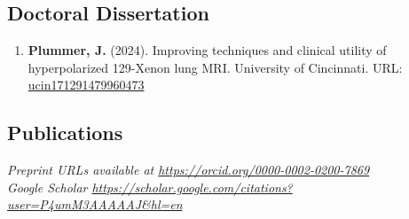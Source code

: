 \documentclass[12pt,]{scrartcl}
\begin{document}
\subsection{Doctoral Dissertation}\label{dissertation}
\begin{enumerate}
    \leftskip-0.13in
    \item \textbf{Plummer, J.} (2024). Improving techniques and clinical utility of hyperpolarized 129-Xenon lung MRI. University of Cincinnati. URL: \href{http://rave.ohiolink.edu/etdc/view?acc_num=ucin171291479960473}{ucin171291479960473}
    
\end{enumerate}
\subsection{Publications}\label{publications}

\emph{Preprint URLs available at
\url{https://orcid.org/0000-0002-0200-7869}}\\
\emph{Google Scholar \url{https://scholar.google.com/citations?user=P4umM3AAAAAJ&hl=en}}
\end{document}
